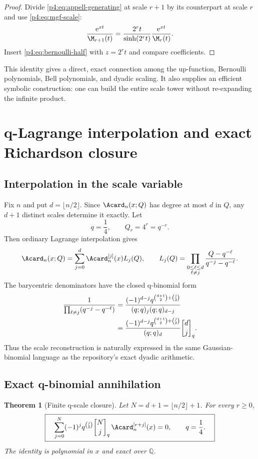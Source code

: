 \documentclass[11pt]{article}
\numberwithin{equation}{section}
\newtheorem{theorem}{Theorem}[section]
\theoremstyle{definition}
\theoremstyle{remark}
\newcommand{\Q}{\mathbb Q}
\newcommand{\e}{\mathrm e}
\newcommand{\qbinom}[3]{\genfrac{[}{]}{0pt}{}{#1}{#2}_{#3}}
\begin{document}
\begin{proof}
Divide \eqref{p4:eq:appell-generating} at scale $r+1$ by its counterpart at scale $r$ and use \eqref{p4:eq:mgf-scale}:
\[
 \frac{\e^{xt}}{\M_{r+1}(t)}
 =\frac{2^rt}{\sinh(2^rt)}\frac{\e^{xt}}{\M_r(t)}.
\]
Insert \eqref{p4:eq:bernoulli-half} with $z=2^rt$ and compare coefficients.
\end{proof}

This identity gives a direct, exact connection among the up-function, Bernoulli polynomials, Bell polynomials, and dyadic scaling.  It also supplies an efficient symbolic construction: one can build the entire scale tower without re-expanding the infinite product.

\section{q-Lagrange interpolation and exact Richardson closure}
\label{p4:sec:qscale}

\subsection{Interpolation in the scale variable}
Fix $n$ and put $d=\lfloor n/2\rfloor$.  Since $\Acard_n(x;Q)$ has degree at most $d$ in $Q$, any $d+1$ distinct scales determine it exactly.  Let
\begin{equation}
 q=\frac14,
 \qquad Q_r=4^r=q^{-r}.
 \label{p4:eq:qscale-nodes}
\end{equation}
Then ordinary Lagrange interpolation gives
\begin{equation}
 \Acard_n(x;Q)
 =\sum_{j=0}^{d}\Acard_n^{[j]}(x)L_j(Q),
 \qquad
 L_j(Q)=\prod_{\substack{0\le\ell\le d\\\ell\ne j}}
 \frac{Q-q^{-\ell}}{q^{-j}-q^{-\ell}}.
 \label{p4:eq:scale-lagrange}
\end{equation}
The barycentric denominators have the closed q-binomial form
\begin{align}
 \frac1{\prod_{\ell\ne j}(q^{-j}-q^{-\ell})}
 &=\frac{(-1)^{d-j}q^{\binom{d+1}{2}+\binom j2}}
 {(q;q)_j(q;q)_{d-j}}
 \label{p4:eq:barycentric-q}\\
 &=\frac{(-1)^{d-j}q^{\binom{d+1}{2}+\binom j2}}
 {(q;q)_d}\qbinom{d}{j}{q}.
 \notag
\end{align}
Thus the scale reconstruction is naturally expressed in the same Gaussian-binomial language as the repository's exact dyadic arithmetic.

\subsection{Exact q-binomial annihilation}
\begin{theorem}[Finite q-scale closure]
\label{p4:thm:q-closure}
Let $N=d+1=\lfloor n/2\rfloor+1$.  For every $r\ge0$,
\begin{equation}
 \boxed{\quad
 \sum_{j=0}^{N}(-1)^jq^{\binom j2}
 \qbinom{N}{j}{q}\,
 \Acard_n^{[r+j]}(x)=0,
 \qquad q=\frac14.
 \quad}
 \label{p4:eq:q-closure}
\end{equation}
The identity is polynomial in $x$ and exact over $\Q$.
\end{theorem}
\end{document}
